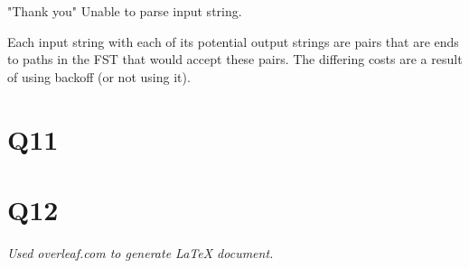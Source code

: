 \documentclass[12pt, letterpaper]{article}
\begin{document}
"Thank you"
Unable to parse input string.

Each input string with each of its potential output strings are pairs that are ends to paths in the FST that would accept these pairs. The differing costs are a result of using backoff (or not using it). 

\section{Q11}

\section{Q12}

\begin{center}
\textit{Used overleaf.com to generate LaTeX document.}
\end{center}
\end{document}
